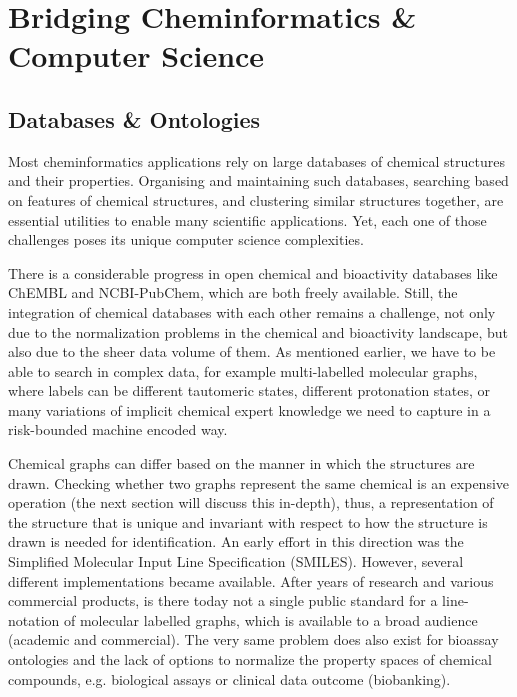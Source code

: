\documentclass{sig-alternate}
\begin{document}
\section{Bridging Cheminformatics \& Computer Science}
\label{sec:bridg-chem-}

\subsection{Databases \& Ontologies}
\label{sec:datab--ontol}

Most cheminformatics applications rely on large databases of chemical structures
and their properties. Organising and maintaining such databases, searching based
on features of chemical structures, and clustering similar structures together,
are essential utilities to enable many scientific applications. Yet, each one of
those challenges poses its unique computer science complexities.

There is a considerable progress in open chemical and bioactivity databases like
ChEMBL and NCBI-PubChem, which are both freely available. Still, the integration
of chemical databases with each other remains a challenge, not only due to the
normalization problems in the chemical and bioactivity landscape, but also due
to the sheer data volume of them. As mentioned earlier, we have to be able to
search in complex data, for example multi-labelled molecular graphs, where
labels can be different tautomeric states, different protonation states, or many
variations of implicit chemical expert knowledge we need to capture in a
risk-bounded machine encoded way.

Chemical graphs can differ based on the manner in which the structures are
drawn. Checking whether two graphs represent the same chemical is an expensive
operation (the next section will discuss this in-depth), thus, a representation
of the structure that is unique and invariant with respect to how the structure
is drawn is needed for identification. An early effort in this direction was the
Simplified Molecular Input Line Specification (SMILES). However, several
different implementations became available. After years of research and various
commercial products, is there today not a single public standard for a
line-notation of molecular labelled graphs, which is available to a broad
audience (academic and commercial). The very same problem does also exist for
bioassay ontologies and the lack of options to normalize the property spaces of
chemical compounds, e.g. biological assays or clinical data outcome
(biobanking).
   
\end{document}
